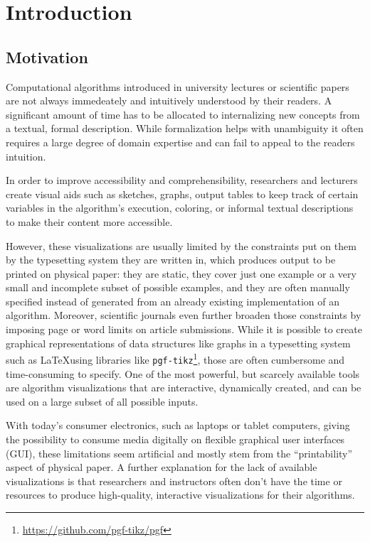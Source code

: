 \section{Introduction}

\subsection{Motivation}

Computational algorithms introduced in university lectures or scientific papers are not always immedeately and intuitively understood by their readers.
A significant amount of time has to be allocated to internalizing new concepts from a textual, formal description. While formalization helps with unambiguity it often requires a large degree of domain expertise and can fail to appeal to the readers intuition.

In order to improve accessibility and comprehensibility, researchers and lecturers create visual aids such as sketches, graphs, output tables to keep track of certain variables in the algorithm's execution, coloring, or informal textual descriptions to make their content more accessible. 

However, these visualizations are usually limited by the constraints put on them by the typesetting system they are written in, which produces output to be printed on physical paper: they are static, they cover just one example or a very small and incomplete subset of possible examples, and they are often manually specified instead of generated from an already existing implementation of an algorithm. Moreover, scientific journals even further broaden those constraints by imposing page or word limits on article submissions. While it is possible to create graphical representations of data structures like graphs in a typesetting system such as \LaTeX using libraries like \texttt{pgf-tikz}\footnote{\url{https://github.com/pgf-tikz/pgf}}, those are often cumbersome and time-consuming to specify.
One of the most powerful, but scarcely available tools are algorithm visualizations that are interactive, dynamically created, and can be used on a large subset of all possible inputs. 



With today's consumer electronics, such as laptops or tablet computers, giving the possibility to consume media digitally on flexible graphical user interfaces (GUI), these limitations seem artificial and mostly stem from the ``printability'' aspect of physical paper. A further explanation for the lack of available visualizations is that researchers and instructors often don't have the time or resources to produce high-quality, interactive visualizations for their algorithms.


